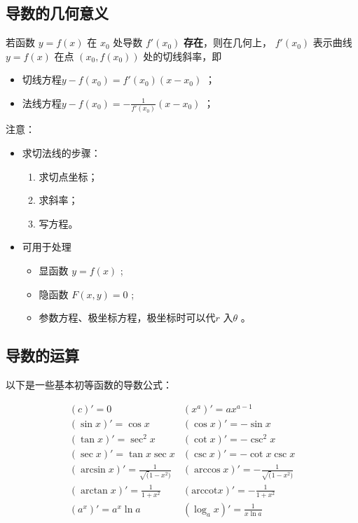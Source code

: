 \subsection{导数的几何意义}

若函数 $ y=f(x) $ 在 $ x_0 $ 处导数 $ f'(x_0) $ \textbf{存在}，则在几何上， $ f'(x_0) $ 表示曲线
$ y=f(x) $ 在点 $ (x_0,f(x_0)) $ 处的切线斜率，即\begin{itemize}
    \item 切线方程$ y-f(x_0)=f'(x_0)(x-x_0) $ ；
    \item 法线方程$ y-f(x_0)=-\frac1{f'(x_0)}(x-x_0) $ ；
\end{itemize}

注意：
\begin{itemize}
    \item 求切法线的步骤：\begin{enumerate}
        \item 求切点坐标；
        \item 求斜率；
        \item 写方程。
    \end{enumerate}
    \item 可用于处理\begin{itemize}
        \item 显函数 $ y=f(x) $ ;
        \item 隐函数 $ F(x,y)=0 $ ;
        \item 参数方程、极坐标方程，极坐标时可以代$ r $ 入$ \theta $ 。
    \end{itemize}
\end{itemize}

\subsection{导数的运算}

以下是一些基本初等函数的导数公式：

\begin{equation*}
    \begin{array}{ll}
        (c)'=0&(x^a)'=ax^{a-1}\\
        (\sin x)'=\cos x&(\cos x)'=-\sin x\\ 
        (\tan x)'=\sec^2 x&(\cot x)'=-\csc^2 x\\ 
        (\sec x)'=\tan x\sec x&(\csc x)'=-\cot x\csc x\\ 
        (\arcsin x)'=\frac{1}{\displaystyle\sqrt(1-x^2)}&(\arccos x)'=-\frac{1}{\displaystyle\sqrt(1-x^2)}\\
        (\arctan x)'=\frac1{1+x^2} & (\textrm{arccot} x)'=-\frac1{1+x^2}\\
        (a^x)'=a^x\ln a&(\log_a x)'=\frac1{x\ln a}\\
    \end{array}
\end{equation*}

